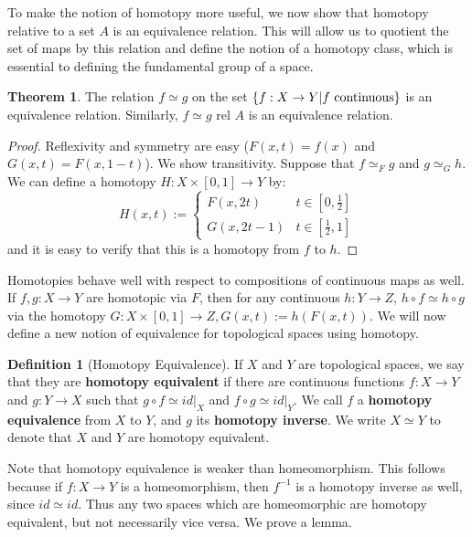 \documentclass[11pt, oneside]{amsart}   	%
\theoremstyle{definition}
\newtheorem{definition}{Definition}[section]
\newtheorem{theorem}{Theorem}[section]
\begin{document}
	To make the notion of homotopy more useful, we now show that homotopy relative to a set $A$ is an equivalence relation. This will allow us to quotient the 
	set of maps by this relation and define the notion of a homotopy class, which is essential to defining the fundamental group of a space.
	
	\begin{theorem}
		The relation $f\simeq g$ on the set $\{f : X\rightarrow Y | f\textnormal{ continuous}\}$ is an equivalence relation. Similarly, $f\simeq g$ rel $A$ is an 
		equivalence relation.
	\end{theorem}
	
	\begin{proof}
		Reflexivity and symmetry are easy ($F(x, t) = f(x)$ and $G(x, t) = F(x, 1 - t)$). We show transitivity. Suppose that $f\simeq_F g$ and $g\simeq_G h$. 
		We can define a homotopy $H : X\times [0, 1]\rightarrow Y$ by:
		$$
			H(x, t) := \begin{cases}
				F(x, 2t) & t\in [0, \frac{1}{2}] \\
				G(x, 2t - 1) & t\in [\frac{1}{2}, 1]
			\end{cases}
		$$
		and it is easy to verify that this is a homotopy from $f$ to $h$. 
	\end{proof}
	
	Homotopies behave well with respect to compositions of continuous maps as well. If $f, g : X\rightarrow Y$ are homotopic via $F$, then for any continuous 
	$h : Y\rightarrow Z$, $h\circ f\simeq h\circ g$ via the homotopy $G : X\times [0, 1]\rightarrow Z, G(x, t) := h(F(x, t))$. We will now define a new notion of 
	equivalence for topological spaces using homotopy.
	
	\begin{definition}[Homotopy Equivalence]
		If $X$ and $Y$ are topological spaces, we say that they are \textbf{homotopy equivalent} if there are continuous functions $f : X\rightarrow Y$ and $g : 
		Y\rightarrow X$ such that $g\circ f\simeq id|_X$ and $f\circ g\simeq id|_Y$. We call $f$ a \textbf{homotopy equivalence} from $X$ to $Y$, and $g$ its 
		\textbf{homotopy inverse}. We write $X\simeq Y$ to denote that $X$ and $Y$ are homotopy equivalent. 
	\end{definition}
	
	Note that homotopy equivalence is weaker than homeomorphism. This follows because if $f : X\rightarrow Y$ is a homeomorphism, then $f^{-1}$ is a 
	homotopy inverse as well, since $id\simeq id$. Thus any two spaces which are homeomorphic are homotopy equivalent, but not necessarily vice versa. 
	We prove a lemma.
	
\end{document}
